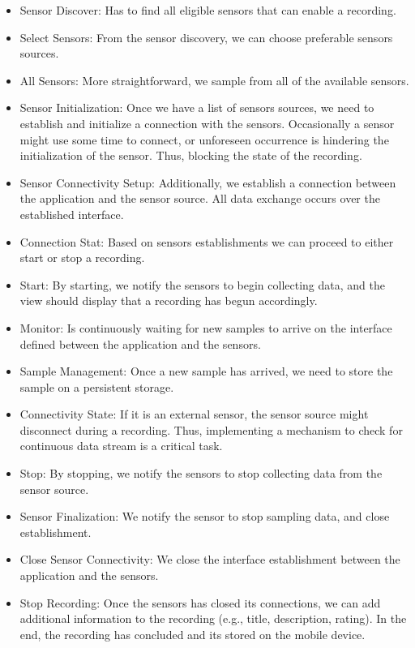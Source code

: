 \begin{itemize}
    \item Sensor Discover: Has to find all eligible sensors that can enable a recording.
    \item Select Sensors: From the sensor discovery, we can choose preferable sensors sources.
    \item  All Sensors: More straightforward, we sample from all of the available sensors.
    \item Sensor Initialization: Once we have a list of sensors sources, we need to establish and initialize a connection with the sensors. Occasionally a sensor might use some time to connect, or unforeseen occurrence is hindering the initialization of the sensor. Thus, blocking the state of the recording. 
    \item Sensor Connectivity Setup: Additionally, we establish a connection between the application and the sensor source. All data exchange occurs over the established interface. 
    \item Connection Stat: Based on sensors establishments we can proceed to either start or stop a recording. 
    \item Start: By starting, we notify the sensors to begin collecting data, and the view should display that a recording has begun accordingly.
    \item Monitor: Is continuously waiting for new samples to arrive on the interface defined between the application and the sensors.
    \item Sample Management: Once a new sample has arrived, we need to store the sample on a persistent storage.
    \item Connectivity State: If it is an external sensor, the sensor source might disconnect during a recording. Thus, implementing a mechanism to check for continuous data stream is a critical task.
    \item Stop: By stopping, we notify the sensors to stop collecting data from the sensor source.
    \item Sensor Finalization: We notify the sensor to stop sampling data, and close establishment.
    \item Close Sensor Connectivity: We close the interface establishment between the application and the sensors. 
    \item Stop Recording: Once the sensors has closed its connections, we can add additional information to the recording (e.g., title, description, rating). In the end, the recording has concluded and its stored on the mobile device.

\end{itemize}

